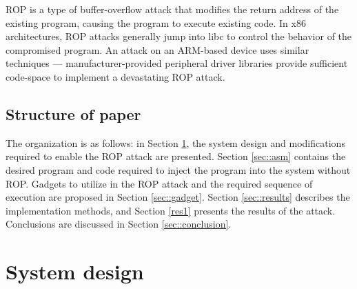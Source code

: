 	ROP is a type of buffer-overflow attack that modifies the return address of the existing program, causing the program to execute existing code. In x86 architectures, ROP attacks generally jump into libc to control the behavior of the compromised program. An attack on an ARM-based device uses similar techniques --- manufacturer-provided peripheral driver libraries provide sufficient code-space to implement a devastating ROP attack.  



\subsection{Structure of paper}
	The organization is as follows: in Section \ref{sec::design}, the system design and modifications required to enable the ROP attack are presented. Section \ref{sec::asm} contains the desired program and code required to inject the program into the system without ROP. Gadgets to utilize in the ROP attack and the required sequence of execution are proposed in Section \ref{sec::gadget}. Section \ref{sec::results} describes the implementation methods, and Section \ref{res1} presents the results of the attack. Conclusions are discussed in Section \ref{sec::conclusion}. 




\section{System design} \label{sec::design} %


